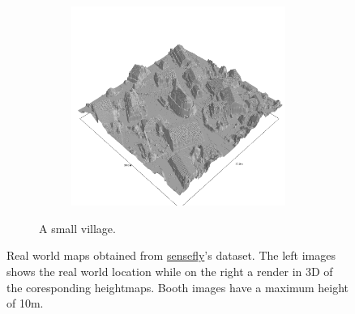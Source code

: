 \documentclass[../document.tex]{subfiles}
\begin{document}
\begin{figure}[H]
\begin{subfigure}[b]{1\textwidth}
\begin{subfigure}[b]{0.45\textwidth}
    \end{subfigure}  
    \begin{subfigure}[b]{0.45\textwidth}
        \includegraphics[width=\textwidth]{../img/hm3d_borders/sullens.png}
    \end{subfigure} 
    \caption{A small village.} 
\end{subfigure}
\caption{Real world maps obtained from \href{https://www.sensefly.com/education/datasets/}{sensefly}'s dataset. The left images shows the real world location while on the right a render in 3D of the coresponding heightmaps. Booth images have a maximum height of 10m.}  
\end{figure}
\end{document}

